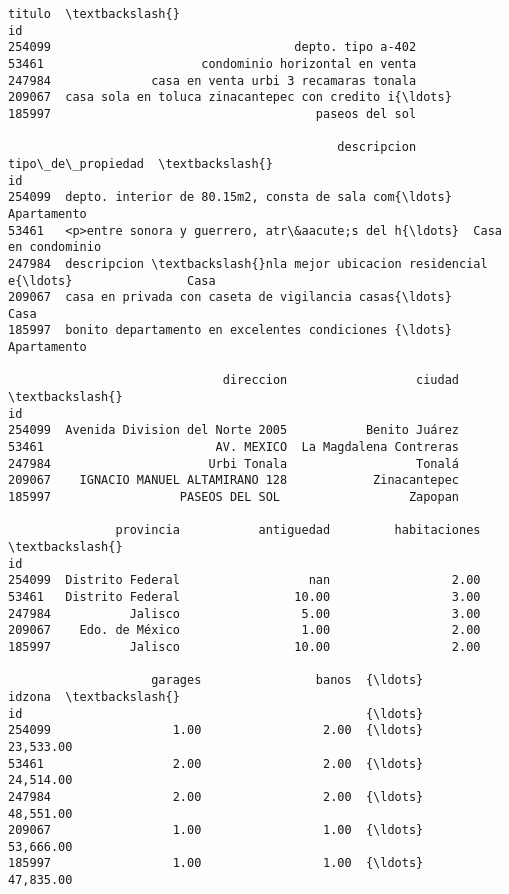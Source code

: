 \documentclass[11pt]{article}
\newcommand{\prompt}[4]{
        \llap{{\color{#2}[#3]: #4}}\vspace{-1.25em}
    }
\begin{document}
            \begin{tcolorbox}[breakable, boxrule=.5pt, size=fbox, pad at break*=1mm, opacityfill=0]
\prompt{Out}{outcolor}{23}{\hspace{3.5pt}}
\begin{Verbatim}[commandchars=\\\{\}]
                                                   titulo  \textbackslash{}
id
254099                                  depto. tipo a-402
53461                      condominio horizontal en venta
247984              casa en venta urbi 3 recamaras tonala
209067  casa sola en toluca zinacantepec con credito i{\ldots}
185997                                     paseos del sol

                                              descripcion   tipo\_de\_propiedad  \textbackslash{}
id
254099  depto. interior de 80.15m2, consta de sala com{\ldots}         Apartamento
53461   <p>entre sonora y guerrero, atr\&aacute;s del h{\ldots}  Casa en condominio
247984  descripcion \textbackslash{}nla mejor ubicacion residencial e{\ldots}                Casa
209067  casa en privada con caseta de vigilancia casas{\ldots}                Casa
185997  bonito departamento en excelentes condiciones {\ldots}         Apartamento

                              direccion                  ciudad  \textbackslash{}
id
254099  Avenida Division del Norte 2005           Benito Juárez
53461                        AV. MEXICO  La Magdalena Contreras
247984                      Urbi Tonala                  Tonalá
209067    IGNACIO MANUEL ALTAMIRANO 128            Zinacantepec
185997                  PASEOS DEL SOL                  Zapopan

               provincia           antiguedad         habitaciones  \textbackslash{}
id
254099  Distrito Federal                  nan                 2.00
53461   Distrito Federal                10.00                 3.00
247984           Jalisco                 5.00                 3.00
209067    Edo. de México                 1.00                 2.00
185997           Jalisco                10.00                 2.00

                    garages                banos  {\ldots}               idzona  \textbackslash{}
id                                                {\ldots}
254099                 1.00                 2.00  {\ldots}            23,533.00
53461                  2.00                 2.00  {\ldots}            24,514.00
247984                 2.00                 2.00  {\ldots}            48,551.00
209067                 1.00                 1.00  {\ldots}            53,666.00
185997                 1.00                 1.00  {\ldots}            47,835.00


\end{Verbatim}
\end{tcolorbox}
\end{document}
